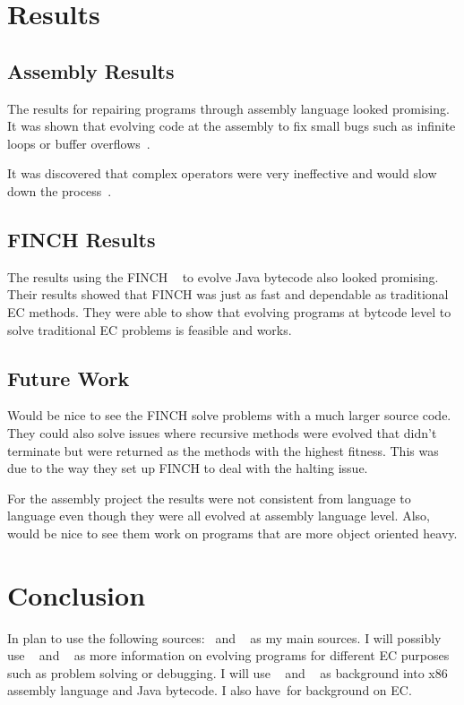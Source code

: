\documentclass{sig-alternate}
\begin{document}
\section{Results}
\subsection{Assembly Results}
The results for repairing programs through assembly language looked promising. It was shown that evolving code at the assembly to fix small bugs such as infinite loops or buffer overflows~\cite{Assembly:2010}.

It was discovered that complex operators were very ineffective and would slow down the process~\cite{Assembly:2010}.

\subsection{FINCH Results}
The results using the FINCH ~\cite{FINCH:2010} to evolve Java bytecode also looked promising. Their results showed that FINCH was just as fast and dependable as traditional EC methods. They were able to show that evolving programs at bytcode level to solve traditional EC problems is feasible and works.

\subsection{Future Work}
Would be nice to see the FINCH solve problems with a much larger source code. They could also solve issues where recursive methods were evolved that didn't terminate but were returned as the methods with the highest fitness. This was due to the way they set up FINCH to deal with the halting issue. 
	
For the assembly project the results were not consistent from language to language even though they were all evolved at assembly language level. Also, would be nice to see them work on programs that are more object oriented heavy. 
	
	
\section{Conclusion} 	





In plan to use the following sources:~\cite{Assembly:2010} and ~\cite{FINCH:2010} as my main
sources. I will possibly use ~\cite{GISMOE:2012} and ~\cite{UCL:2012} as more information on evolving programs for different EC purposes such as problem solving or debugging. I will use ~\cite{x86:2014} and ~\cite{Oracle:2013} as background into x86 assembly language and Java bytecode. I also have~\cite{Nic:2008}for background on EC.


\end{document}
